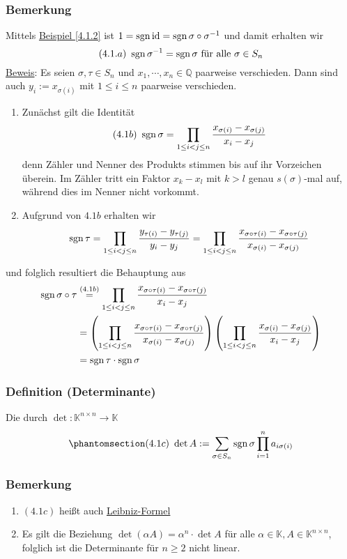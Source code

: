 \subsubsection{Bemerkung}
Mittels \hyperref[4.1.2]{Beispiel \ref*{4.1.2}} ist $1=\operatorname{sgn} \operatorname{id} =\operatorname{sgn} \sigma \circ \sigma ^{-1}$ und damit erhalten wir
\[\label{4.1a} (4.1.a)\ \operatorname{sgn} \sigma ^{-1}=\operatorname{sgn} \sigma\text{ für alle }\sigma \in S_n\]
\underline{Beweis}: Es seien $\sigma ,\tau \in S_n$ und $x_1,\cdots ,x_n\in\mathbb{Q}$ paarweise verschieden.  Dann sind auch $y_i:=x_{\sigma (i)}$ mit $1\leq i\leq n$ paarweise verschieden.
\renewcommand{\labelenumi}{(\Roman{enumi})}
\begin{enumerate}
\item Zunächst gilt die Identität
\[\label{4.1b} (4.1b)\ \operatorname{sgn} \sigma =\prod _{1 \leq i<j \leq n} \frac{x_{\sigma (i)}-x_{\sigma (j)}}{x_i -x_j}\]
denn Zähler und Nenner des Produkts stimmen bis auf ihr Vorzeichen überein.  Im Zähler tritt ein Faktor $x_k -x_l$ mit $k>l$ genau $s(\sigma )$-mal auf, während dies im Nenner nicht vorkommt.
\item Aufgrund von \hyperref[4.1b]{$4.1b$} erhalten wir
\[\operatorname{sgn} \tau =\prod _{1\leq i<j\leq n} \frac{y_{\tau (i)} -y_{\tau (j)}}{y_i - y_j}=\prod _{1\leq i<j\leq n} \frac{x_{\sigma \circ \tau (i)}-x_{\sigma \circ \tau (j)}}{x_{\sigma (i)}-x_{\sigma (j)}}\]
\end{enumerate}
und folglich resultiert die Behauptung aus
\begin{align*}
\operatorname{sgn}  \sigma\circ\tau &\stackrel{(4.1b)}{=} \prod _{1\leq i<j\leq n}\frac{x_{\sigma \circ \tau (i)}-x_{\sigma\circ\tau (j)}}{x_i -x_j}\\
&= \left(\prod _{1\leq i<j\leq n} \frac{x_{\sigma\circ\tau (i)}-x_{\sigma\circ\tau (j)}}{x_{\sigma (i)}-x_{\sigma (j)}}\right) \left(\prod _{1\leq i<j\leq n}\frac{x_{\sigma (i)}-x_{\sigma (j)}}{x_i-x_j}\right)\\
&= \operatorname{sgn} \tau \cdot \operatorname{sgn} \sigma
\end{align*}
\subsubsection{Definition (Determinante)}
Die durch $\det\colon\mathbb{K}^{n\times n}\rightarrow \mathbb{K}$
\[\phantomsection\label{4.1c}(4.1c)\ \det A:=\sum _{\sigma\in S_n} \sgn \sigma \prod _{i=1}^na_{i\sigma (i)}\]
\subsubsection{Bemerkung}
\renewcommand{\labelenumi}{(\arabic{enumi})}
\begin{enumerate}
\item \hyperref[4.1c]{$(4.1c)$} heißt auch \underline{Leibniz-Formel}
\item Es gilt die Beziehung $\det(\alpha A)=\alpha ^n\cdot\det A$ für alle $\alpha\in\mathbb{K},A\in\mathbb{K}^{n\times n}$, folglich ist die Determinante für $n\geq 2$ nicht linear.
\end{enumerate}
